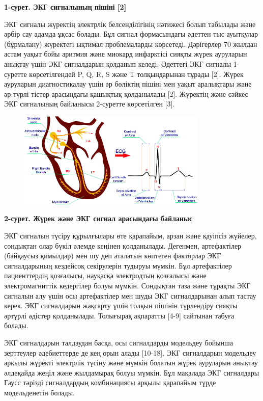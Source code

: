{{\bfseries 1-сурет. ЭКГ сигналының пішіні {[}2{]}}

ЭКГ сигналы жүректің электрлік белсенділігінің нәтижесі болып табылады
және әрбір сау адамда ұқсас болады. Бұл сигнал формасындағы әдеттен тыс
ауытқулар (бұрмалану) жүректегі ықтимал проблемаларды көрсетеді.
Дәрігерлер 70 жылдан астам уақыт бойы аритмия және миокард инфарктісі
сияқты жүрек ауруларын анықтау үшін ЭКГ сигналдарын қолданып келеді.
Әдеттегі ЭКГ сигналы 1-суретте көрсетілгендей P, Q, R, S және T
толқындарынан тұрады {[}2{]}. Жүрек ауруларын диагностикалау үшін әр
бөліктің пішіні мен уақыт аралықтары және әр түрлі тістер арасындағы
қашықтық қолданылады {[}2{]}. Жүректің және сәйкес ЭКГ сигналының
байланысы 2-суретте көрсетілген {[}3{]}.

\begin{figure}[H]
	\centering
	\includegraphics[width=0.8\textwidth]{media/ict/image41}
	\caption*{}
\end{figure}


{\bfseries 2-сурет. Жүрек және ЭКГ сигнал арасындағы байланыс}

ЭКГ сигналын түсіру құрылғылары өте қарапайым, арзан және қауіпсіз
жүйелер, сондықтан олар бүкіл әлемде кеңінен қолданылады. Дегенмен,
артефактілер (байқаусыз қимылдар) мен шу деп аталатын көптеген факторлар
ЭКГ сигналдарының кездейсоқ секірулерін тудыруы мүмкін. Бұл артефактілер
пациенттердің қозғалысы, науқасқа электродтың қозғалысы және
электромагниттік кедергілер болуы мүмкін. Сондықтан таза және тұрақты
ЭКГ сигналын алу үшін осы артефактілер мен шуды ЭКГ сигналдарынан алып
тастау керек. ЭКГ сигналдарын жақсарту үшін толқын пішінін түрлендіру
сияқты әртүрлі әдістер қолданылады. Толығырақ ақпаратты {[}4-9{]}
сайтынан табуға болады.

ЭКГ сигналдарын талдаудан басқа, осы сигналдарды модельдеу бойынша
зерттеулер әдебиеттерде де кең орын алады {[}10-18{]}. ЭКГ сигналдарын
модельдеу арқылы жүректі электрлік түсіну және мүмкін болатын жүрек
ауруларын анықтау әлдеқайда жеңіл және жылдамырақ болуы мүмкін. Бұл
мақалада ЭКГ сигналдары Гаусс тәрізді сигналдардың комбинациясы арқылы
қарапайым түрде модельденетін болады.

}
